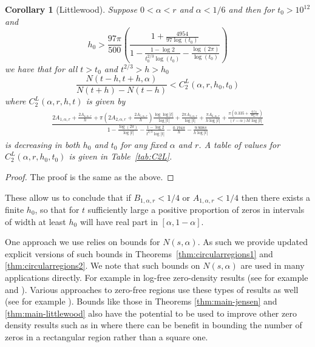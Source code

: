 \documentclass[10pt,english,letter, reqno]{amsart}
\theoremstyle{plain}
\newtheorem{corollary}[theorem]{Corollary}
\theoremstyle{definition}
\begin{document}
\begin{corollary}[Littlewood]\label{cor:main-littlewood}
Suppose $0<\alpha<r$ and $\alpha<1/6$ and then for $t_0>10^{12}$ and
\[ h_0>\frac{97\pi}{500}\left(\frac{1 + \frac{4954}{97\log(t_0)}}{1 -\frac{1-\log 2}{t_0^{2/3}\log(t_0)}-\frac{\log(2\pi)}{\log(t_0)}}\right) \]
 we have that for all $t>t_0$ and $t^{2/3}>h>h_0$  
\[\frac{ N(t-h,t+h,\alpha)}{N(t+h)-N(t-h)}  < C_2^L(\alpha,r,h_0,t_0) \]
where $C_2^L(\alpha,r,h,t) $ is given by
\begin{align*}    \frac{2A_{1,\alpha,r}+\frac{2A_{4,\alpha,r}}{h}+ \pi(2A_{2,\alpha,r}+\frac{2A_{5,\alpha,r}}{h})\frac{\log\log|t|}{\log|t|}+\frac{2\pi A_{3,\alpha,r}}{\log|t|} + \frac{\pi A_{6,\alpha,r}}{h\log|t|} + \frac{\pi\left(0.335 + \frac{0.51}{\log|t|}\right)}{(r-\alpha)ht\log|t|}}
{1 - \frac{\log(2\pi)}{\log|t|} -  \frac{1-\log 2}{t^{2/3} \log|t|} - \frac{0.194\pi}{h} - \frac{9.908\pi}{h\log|t|}}
\end{align*}
is decreasing in both $h_0$ and $t_0$ for any fixed $\alpha$ and $r$.
A table of values for $C_2^L(\alpha,r,h_0,t_0)   $ is given in Table~\ref{tab:C2L}.
\end{corollary}
\begin{proof}
The proof is the same as the above.
\end{proof}
These allow us to conclude that if $B_{1,\alpha,r}<1/4$ or $A_{1,\alpha,r}<1/4$ then there exists a finite $h_0$, so that for $t$ sufficiently large a positive proportion of zeros in intervals of width at least $h_0$ will have real part in $[\alpha,1-\alpha]$.


One approach we use relies on bounds for $N(s,\alpha)$. As such we provide updated explicit versions of such bounds in Theorems~\ref{thm:circularregions1} and \ref{thm:circularregions2}.
We note that such bounds on $N(s,\alpha)$ are used in many applications directly. For example in log-free zero-density results (see for example \cite[Corollary~2.3]{Bellotti2025} and \cite[Lemmas 1 and 2]{Pintz2019}). Various approaches to zero-free regions use these types of results as well (see for example \cite{Montgomery1973,Bellotti2024,Ford2002}). Bounds like those in Theorems \ref{thm:main-jensen} and \ref{thm:main-littlewood} also have the potential to be used to improve other zero density results such as in \cite{Bellotti2025,Bellotti2023,Pintz2023} where there can be benefit in bounding the number of zeros in a rectangular region rather than a square one. 
\end{document}
